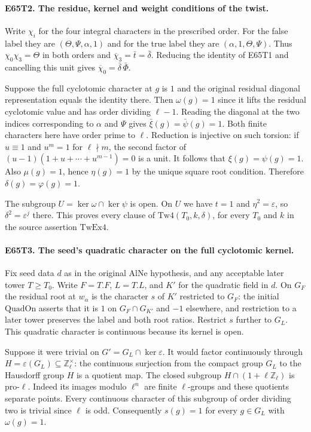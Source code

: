 \paragraph{E65T2. The residue, kernel and weight conditions of the twist.}
Write $\chi_i$ for the four integral characters in the prescribed order.
For the false label they are $(\Theta,\Psi,\alpha,1)$ and for the
true label they are $(\alpha,1,\Theta,\Psi)$. Thus
$\chi_0\chi_3=\Theta$ in both orders and $\overline{\chi}_3=\bar t=\bar\delta$.
Reducing the identity of E65T1 and cancelling this unit gives
$\overline{\chi}_0=\bar\delta\,\bar\Phi$.

Suppose the full cyclotomic character at $g$ is $1$ and the original
residual diagonal representation equals the identity there. Then
$\omega(g)=1$ since it lifts the residual cyclotomic value and has
order dividing $\ell-1$. Reading the diagonal at the two indices
corresponding to $\alpha$ and $\Psi$ gives
$\bar\xi(g)=\bar\psi(g)=1$. Both finite characters here have
order prime to $\ell$. Reduction is injective on such torsion:
if $u\equiv1$ and $u^m=1$ for $\ell\nmid m$, the second factor of
$(u-1)(1+u+\cdots+u^{m-1})=0$ is a unit. It follows that
$\xi(g)=\psi(g)=1$. Also $\mu(g)=1$, hence $\eta(g)=1$ by the
unique square root condition. Therefore $\delta(g)=\varphi(g)=1$.

The subgroup $U=\ker\omega\cap\ker\psi$ is open. On $U$ we have
$t=1$ and $\eta^2=\varepsilon$, so $\delta^2=\varepsilon^j$ there.
This proves every clause of $\mathrm{Tw4}(T_0,k,\delta)$, for every
$T_0$ and $k$ in the source assertion $\mathrm{TwEx4}$.

\paragraph{E65T3. The seed's quadratic character on the full cyclotomic kernel.}
Fix seed data $d$ as in the original $\mathrm{AlNe}$ hypothesis, and
any acceptable later tower $T\ge T_0$. Write $F=T.F$, $L=T.L$, and
$K'$ for the quadratic field in $d$. On $G_F$ the residual root at
$w_\alpha$ is the character $s$ of $K'$ restricted to $G_F$: the
initial $\mathrm{QuadOn}$ asserts that it is $1$ on $G_F\cap G_{K'}$
and $-1$ elsewhere, and restriction to a later tower preserves the label
and both root ratios. Restrict $s$ further to $G_L$. This quadratic
character is continuous because its kernel is open.

Suppose it were trivial on $G'=G_L\cap\ker\varepsilon$. It would
factor continuously through $H=\varepsilon(G_L)\subseteq\mathbb Z_\ell^\times$:
the continuous surjection from the compact group $G_L$ to the Hausdorff
group $H$ is a quotient map. The closed subgroup
$H\cap(1+\ell\mathbb Z_\ell)$ is pro-$\ell$. Indeed its images modulo
$\ell^n$ are finite $\ell$-groups and these quotients separate points.
Every continuous character of this subgroup of order dividing two is
trivial since $\ell$ is odd. Consequently $s(g)=1$ for every
$g\in G_L$ with $\omega(g)=1$.

